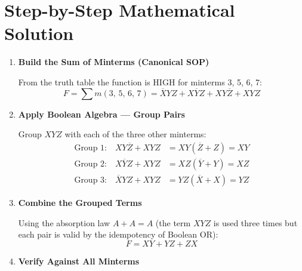 \documentclass[12pt, a4paper]{article}
\begin{document}
\section*{Step-by-Step Mathematical Solution}

\begin{enumerate}[label=\textbf{Step \arabic*.}, leftmargin=*, itemsep=8pt]

  \item \textbf{Build the Sum of Minterms (Canonical SOP)}

  From the truth table the function is HIGH for minterms 3, 5, 6, 7:
  \begin{equation}
    F = \sum m(3,\,5,\,6,\,7)
      = \overline{X}YZ + X\overline{Y}Z + XY\overline{Z} + XYZ
  \end{equation}

  \item \textbf{Apply Boolean Algebra — Group Pairs}

  Group $XYZ$ with each of the three other minterms:
  \begin{align}
    \text{Group 1:}\quad XY\overline{Z} + XYZ &= XY(\overline{Z}+Z) = XY \\
    \text{Group 2:}\quad X\overline{Y}Z + XYZ &= XZ(\overline{Y}+Y) = XZ \\
    \text{Group 3:}\quad \overline{X}YZ + XYZ &= YZ(\overline{X}+X) = YZ
  \end{align}

  \item \textbf{Combine the Grouped Terms}

  Using the absorption law $A + A = A$ (the term $XYZ$ is used three times but each
  pair is valid by the idempotency of Boolean OR):
  \begin{equation}
    \boxed{F = XY + YZ + ZX}
  \end{equation}

  \item \textbf{Verify Against All Minterms}


\end{enumerate}
\end{document}
